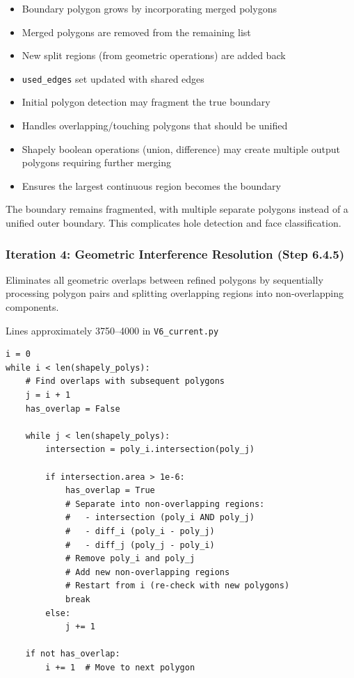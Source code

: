 \begin{itemize}
    \item Boundary polygon grows by incorporating merged polygons
    \item Merged polygons are removed from the remaining list
    \item New split regions (from geometric operations) are added back
    \item \texttt{used\_edges} set updated with shared edges
\end{itemize}

\begin{itemize}
    \item Initial polygon detection may fragment the true boundary
    \item Handles overlapping/touching polygons that should be unified
    \item Shapely boolean operations (union, difference) may create multiple output polygons requiring further merging
    \item Ensures the largest continuous region becomes the boundary
\end{itemize}

The boundary remains fragmented, with multiple separate polygons instead of a unified outer boundary. This complicates hole detection and face classification.

\subsubsection{Iteration 4: Geometric Interference Resolution (Step 6.4.5)}

Eliminates all geometric overlaps between refined polygons by sequentially processing polygon pairs and splitting overlapping regions into non-overlapping components.

Lines approximately 3750--4000 in \texttt{V6\_current.py}

\begin{lstlisting}
i = 0
while i < len(shapely_polys):
    # Find overlaps with subsequent polygons
    j = i + 1
    has_overlap = False
    
    while j < len(shapely_polys):
        intersection = poly_i.intersection(poly_j)
        
        if intersection.area > 1e-6:
            has_overlap = True
            # Separate into non-overlapping regions:
            #   - intersection (poly_i AND poly_j)
            #   - diff_i (poly_i - poly_j)
            #   - diff_j (poly_j - poly_i)
            # Remove poly_i and poly_j
            # Add new non-overlapping regions
            # Restart from i (re-check with new polygons)
            break
        else:
            j += 1
    
    if not has_overlap:
        i += 1  # Move to next polygon
\end{lstlisting}

